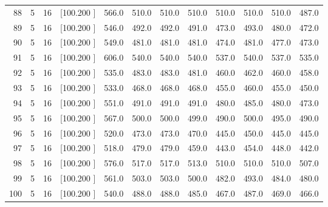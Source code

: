 \documentclass[12pt,a4paper]{article}
\begin{document}
\begin{center}
{\begin{tabular}{r r r r r r r r r r r r}
  88&  5& 16&[100.200   ]&   566.0&   510.0&   510.0&   510.0&   510.0&   510.0&   510.0&   487.0\\[-0.02in]
  89&  5& 16&[100.200   ]&   546.0&   492.0&   492.0&   491.0&   473.0&   493.0&   480.0&   472.0\\[-0.02in]
  90&  5& 16&[100.200   ]&   549.0&   481.0&   481.0&   481.0&   474.0&   481.0&   477.0&   473.0\\[-0.02in]
  91&  5& 16&[100.200   ]&   606.0&   540.0&   540.0&   540.0&   537.0&   540.0&   537.0&   535.0\\[-0.02in]
  92&  5& 16&[100.200   ]&   535.0&   483.0&   483.0&   481.0&   460.0&   462.0&   460.0&   458.0\\[-0.02in]
  93&  5& 16&[100.200   ]&   533.0&   468.0&   468.0&   468.0&   455.0&   460.0&   455.0&   450.0\\[-0.02in]
  94&  5& 16&[100.200   ]&   551.0&   491.0&   491.0&   491.0&   480.0&   485.0&   480.0&   473.0\\[-0.02in]
  95&  5& 16&[100.200   ]&   567.0&   500.0&   500.0&   499.0&   490.0&   500.0&   495.0&   490.0\\[-0.02in]
  96&  5& 16&[100.200   ]&   520.0&   473.0&   473.0&   470.0&   445.0&   450.0&   445.0&   445.0\\[-0.02in]
  97&  5& 16&[100.200   ]&   518.0&   479.0&   479.0&   459.0&   443.0&   454.0&   448.0&   442.0\\[-0.02in]
  98&  5& 16&[100.200   ]&   576.0&   517.0&   517.0&   513.0&   510.0&   510.0&   510.0&   507.0\\[-0.02in]
  99&  5& 16&[100.200   ]&   561.0&   503.0&   503.0&   500.0&   482.0&   493.0&   484.0&   480.0\\[-0.02in]
 100&  5& 16&[100.200   ]&   540.0&   488.0&   488.0&   485.0&   467.0&   487.0&   469.0&   466.0\\[-0.02in]

\hline
\end{tabular}}
\end{center}
\end{document}
